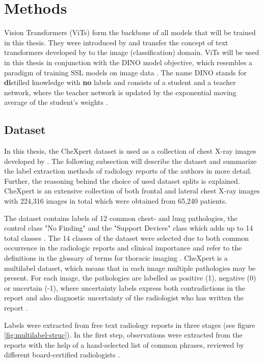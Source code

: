 \section{Methods}
Vision Transformers (ViTs) form the backbone of all models that will be trained in this thesis.
They were introduced by \citep{Dosovitskiy2020} and transfer the concept of text transformers developed by \citep{Vaswani2017} to the image (classification) domain.
ViTs will be used in this thesis in conjunction with the DINO model objective, which resembles a paradigm of training SSL models on image data \citep{Caron2021}.
The name DINO stands for \textbf{di}stilled knowledge with \textbf{no} labels and consists of a student and a teacher network, where the teacher network is updated by the exponential moving average of the student's weights \citep{Caron2021}.
\subsection{Dataset}
In this thesis, the CheXpert dataset is used as a collection of chest X-ray images developed by \citep{Irvin2019}.
The following subsection will describe the dataset and summarize the label extraction methods of radiology reports of the authors in more detail.
Further, the reasoning behind the choice of used dataset splits is explained. 
CheXpert is an extensive collection of both frontal and lateral chest X-ray images with 224,316 images in total which were obtained from 65,240 patients.
\par
The dataset contains labels of 12 common chest- and lung pathologies, the control class "No Finding" and the "Support Devices" class which adds up to 14 total classes \citep{Irvin2019}.
The 14 classes of the dataset were selected due to both common occurrence in the radiologic reports and clinical importance \citep{Irvin2019} and refer to the definitions in the glossary of terms for thoracic imaging \citep{Hansell2008}.   
CheXpert is a multilabel dataset, which means that in each image multiple pathologies may be present.
For each image, the pathologies are labelled as positive (1), negative (0) or uncertain (-1), where uncertainty labels express both contradictions in the report and also diagnostic uncertainty of the radiologist who has written the report \citep{Irvin2019}.
\par
Labels were extracted from free text radiology reports in three stages (see figure \ref{fig:multilabel-struc}).
In the first step, observations were extracted from the reports with the help of a hand-selected list of common phrases, reviewed by different board-certified radiologists \citep{Irvin2019}.
